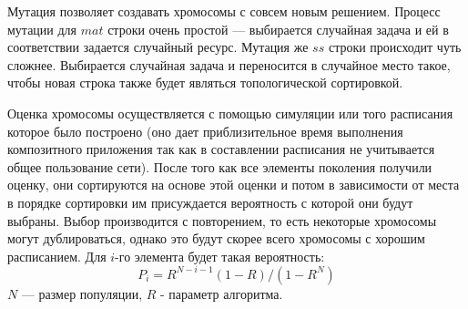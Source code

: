 \begin{spacing}{1.3}
Мутация позволяет создавать хромосомы с совсем новым решением. Процесс мутации для $mat$ строки очень простой --- выбирается случайная задача и ей в соответствии задается случайный ресурс. Мутация же $ss$ строки происходит чуть сложнее. Выбирается случайная задача и переносится в случайное место такое, чтобы новая строка также будет являться топологической сортировкой.



Оценка хромосомы осуществляется с помощью симуляции или того расписания которое было построено (оно дает приблизительное время выполнения композитного приложения так как в составлении расписания не учитывается общее пользование сети). После того как все элементы поколения получили оценку, они сортируются на основе этой оценки и потом в зависимости от места в порядке сортировки им присуждается вероятность с которой они будут выбраны. Выбор производится с повторением, то есть некоторые хромосомы могут дублироваться, однако это будут скорее всего хромосомы с хорошим расписанием. Для $i$-го элемента будет такая вероятность: 
$$
P_i = R^{N - i - 1} (1 - R) / (1 - R^N)
$$
$N$ --- размер популяции, $R$ - параметр алгоритма.





\end{spacing}